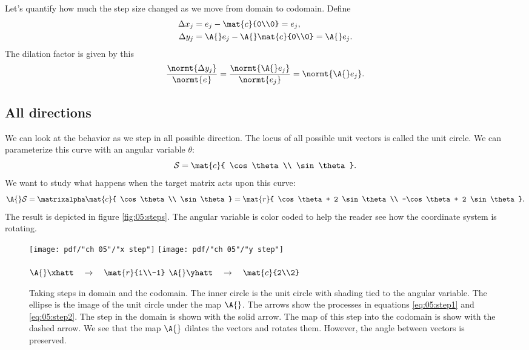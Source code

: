Let's quantify how much the step size changed as we move from domain to codomain. Define
\begin{equation}
\begin{split}
  \Delta x_{j} &= e_{j} - \mat{c}{0\\0} = e_{j}, \\
  \Delta y_{j} &= \A{}e_{j} - \A{}\mat{c}{0\\0} = \A{}e_{j}.
\end{split}
\end{equation}
The dilation factor is given by this
\begin{equation}
  \frac{ \normt{\Delta y_{j}} }{ \normt{e_{}} } = \frac{ \normt{\A{} e_{j}} }{ \normt{e_{j}} } = \normt{\A{} e_{j}}.
\end{equation}

\subsection{All directions}
We can look at the behavior as we step in all possible direction. The locus of all possible unit vectors is called the unit circle. We can parameterize this curve with an angular variable $\theta$:
\begin{equation}
  \mathcal{S} = \mat{c}{ \cos \theta \\ \sin \theta }.
\end{equation}
We want to study what happens when the target matrix acts upon this curve:
\begin{equation}
  \A{} \mathcal{S} = \matrixalpha \mat{c}{ \cos \theta \\ \sin \theta } = \mat{r}{ \cos \theta + 2 \sin \theta \\ -\cos \theta + 2 \sin \theta }.
\end{equation}
The result is depicted in figure \eqref{fig:05:steps}. The angular variable is color coded to help the reader see how the coordinate system is rotating.

\begin{figure}[htbp] %
   \centering
   \texttt{[image: pdf/"ch 05"/"x step"]}  \qquad
   \texttt{[image: pdf/"ch 05"/"y step"]} \\
   \ \\
   $\A{}\xhatt \quad \to \quad \mat{r}{1\\-1}$ \quad \qquad \qquad \qquad $\A{}\yhatt \quad \to \quad \mat{c}{2\\2}$
   \caption[The matrices in nonsingular decompositions are all square]{Taking steps in domain and the codomain. The inner circle is the unit circle with shading tied to the angular variable. The ellipse is the image of the unit circle under the map $\A{}$. The arrows show the processes in equations \eqref{eq:05:step1} and \eqref{eq:05:step2}. The step in the domain is shown with the solid arrow. The map of this step into the codomain is show with the dashed arrow. We see that the map $\A{}$ dilates the vectors and rotates them. However, the angle between vectors is preserved.}
   \label{fig:05:steps}
\end{figure}

